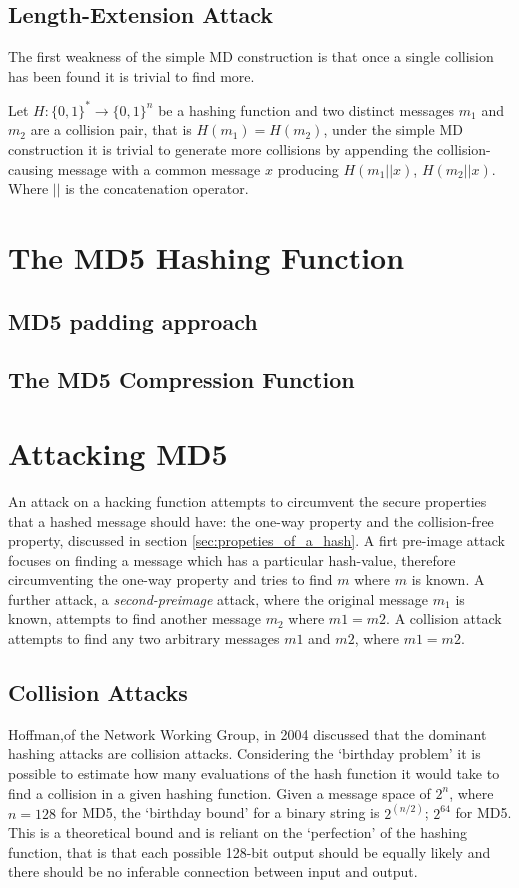 \documentclass[a4paper,12pt]{article}
\newcommand{\hash}[1]{#1}
\begin{document}
\subsection{Length-Extension Attack}
The first weakness of the simple MD construction is that once a single collision has been found it is trivial to find more\cite{Sasaki2006}. 

Let $H: \{0,1\}^* \rightarrow \{0,1\}^n$ be a hashing function and two distinct messages $m_1$ and $m_2$ are a collision pair, that is $H(m_1) = H(m_2)$, under the simple MD construction it is trivial to generate more collisions by appending the collision-causing message with a common message $x$ producing $H(m_1||x)$, $H(m_2||x)$.  Where $||$ is the concatenation operator.

\section{The MD5 Hashing Function}
\subsection{MD5 padding approach}
\label{sec:md5pad}
\subsection{The MD5 Compression Function}

\section{Attacking MD5}
An attack on a hacking function attempts to circumvent the secure properties that a hashed message should have: the one-way property and the collision-free property, discussed in section \ref{sec:propeties_of_a_hash}.
A firt pre-image attack focuses on finding a message which has a particular hash-value, therefore circumventing the one-way property and tries to find $m$ where $\hash{m}$ is known. A further attack, a \emph{second-preimage} attack, where the original message $m_1$ is known, attempts to find another message $m_2$ where $\hash{m1} = \hash{m2}$.
A collision attack attempts to find any two arbitrary messages $m1$ and $m2$, where $\hash{m1} = \hash{m2}$.

\subsection{Collision Attacks}
Hoffman,of the Network Working Group, in 2004 discussed that the dominant hashing attacks are collision attacks. Considering the `birthday problem' it is possible to estimate how many evaluations of the hash function it would take to find a collision in a given hashing function. Given a message space of  $2^n$, where $n = 128$ for MD5, the `birthday bound' for a binary string is $2^{(n/2)}$; $2^{64}$ for MD5. This is a theoretical bound and is reliant on the `perfection' of the hashing function, that is that each possible 128-bit output should be equally likely and there should be no inferable connection between input and output. 
\end{document}
